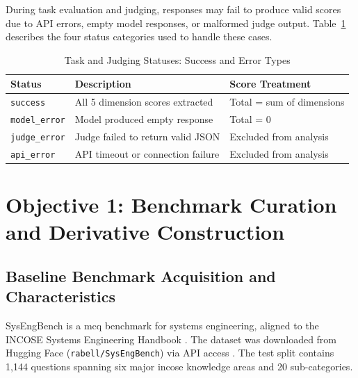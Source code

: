 

During task evaluation and judging, responses may fail to produce valid scores due to API errors, empty model responses, or malformed judge output. Table~\ref{tab:parse_status} describes the four status categories used to handle these cases.

\begin{table}[htbp]
    \centering
    \caption{Task and Judging Statuses: Success and Error Types}
    \label{tab:parse_status}
    \footnotesize
    \begin{tabular}{l p{} p{}}
    \hline
    \textbf{Status} & \textbf{Description} & \textbf{Score Treatment} \\
    \hline
    \texttt{success}      & All 5 dimension scores extracted  & Total = sum of dimensions \\
    \texttt{model\_error}  & Model produced empty response     & Total = 0 \\
    \texttt{judge\_error}  & Judge failed to return valid JSON & Excluded from analysis \\
    \texttt{api\_error}    & API timeout or connection failure & Excluded from analysis \\
    \hline
    \end{tabular}
\end{table}





\section{Objective 1: Benchmark Curation and Derivative Construction}
\label{sec:ch3_obj1}

\subsection{Baseline Benchmark Acquisition and Characteristics}
\label{subsec:ch3_obj1_baseline}

SysEngBench is a \ac{mcq} benchmark for systems engineering, aligned to the INCOSE Systems Engineering Handbook \cite{bell_IntroducingSysEngBenchNovel_2024}. The dataset was downloaded from Hugging Face (\texttt{rabell/SysEngBench}) via API access \cite{bell_RabellSysEngBenchDatasets_2024}. The test split contains 1,144 questions spanning six major \ac{incose} knowledge areas and 20 sub-categories.

